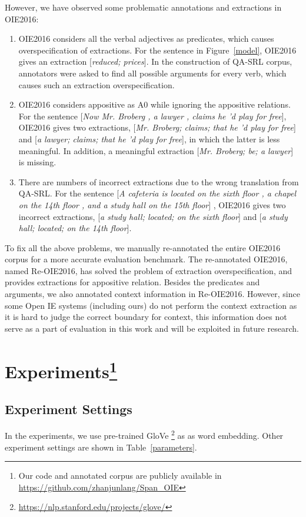 \documentclass[letterpaper]{article} %
\begin{document}
However, we have observed some problematic annotations and extractions in OIE2016:
\begin{enumerate}
\item OIE2016 considers all the verbal adjectives as predicates, which causes overspecification of extractions. For the sentence in Figure~\ref{model}, OIE2016 gives an extraction [\emph{reduced; prices}]. In the construction of QA-SRL corpus, annotators were asked to find all possible arguments for every verb, which causes such an extraction overspecification.
\item OIE2016 considers appositive as A0 while ignoring the appositive relations. For the sentence [\emph{Now Mr. Broberg , a lawyer , claims he 'd play for free}], OIE2016 gives two extractions, [\emph{Mr. Broberg; claims; that he 'd play for free}] and [\emph{a lawyer; claims; that he 'd play for free}], in which the latter is less meaningful. In addition, a meaningful extraction [\emph{Mr. Broberg; be; a lawyer}] is missing.
\item There are numbers of incorrect extractions due to the wrong translation from QA-SRL. For the sentence  [\emph{A cafeteria is located on the sixth floor , a chapel on the 14th floor , and a study hall on the 15th floor}] , OIE2016 gives two incorrect extractions, [\emph{a study hall; located; on the sixth floor}] and [\emph{a study hall; located; on the 14th floor}].
\end{enumerate}

To fix all the above problems, we manually re-annotated the entire OIE2016 corpus for a more accurate evaluation benchmark. The re-annotated OIE2016, named Re-OIE2016, has solved the problem of extraction overspecification, and provides extractions for appositive relation. Besides the predicates and arguments, we also annotated context information in Re-OIE2016. However, since some Open IE systems (including ours) do not perform the context extraction as it is hard to judge the correct boundary for context, this information does not serve as a part of evaluation in this work and will be exploited in future research.

\section{Experiments\footnote{Our code and annotated corpus are publicly available in \url{https://github.com/zhanjunlang/Span_OIE}}}
\subsection{Experiment Settings}
In the experiments, we use pre-trained GloVe \footnote{\url{https://nlp.stanford.edu/projects/glove/}} as as word embedding. Other experiment settings are shown in Table~\ref{parameters}.
\end{document}
